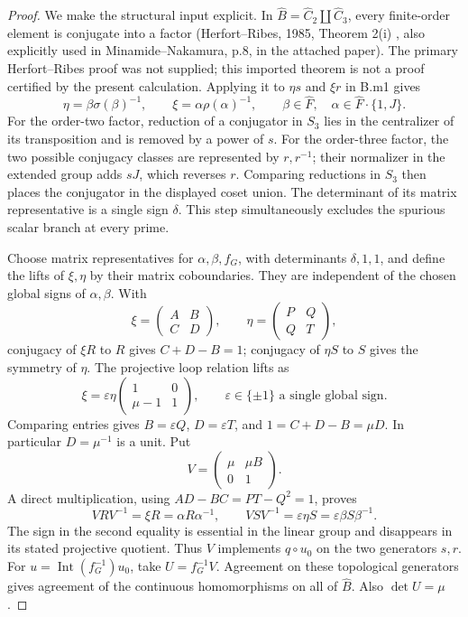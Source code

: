 \begin{proof}
We make the structural input explicit. In $\widehat B=\widehat C_2\amalg\widehat C_3$, every finite-order element is conjugate into a factor (Herfort--Ribes, 1985, Theorem 2(i) \citep{HerfortRibes1985dictionary}, also explicitly used in Minamide--Nakamura, p.8, in the attached paper). The primary Herfort--Ribes proof was not supplied; this imported theorem is not a proof certified by the present calculation. Applying it to $\eta s$ and $\xi r$ in B.m1 gives
\[
 \eta=\beta\sigma(\beta)^{-1},\qquad
 \xi=\alpha\rho(\alpha)^{-1},\qquad
 \beta\in\widehat F,\quad\alpha\in\widehat F\cdot\{1,J\}.
\]
For the order-two factor, reduction of a conjugator in $S_3$ lies in the centralizer of its transposition and is removed by a power of $s$. For the order-three factor, the two possible conjugacy classes are represented by $r,r^{-1}$; their normalizer in the extended group adds $sJ$, which reverses $r$. Comparing reductions in $S_3$ then places the conjugator in the displayed coset union. The determinant of its matrix representative is a single sign $\delta$. This step simultaneously excludes the spurious scalar branch at every prime.

Choose matrix representatives for $\alpha,\beta,f_G$, with determinants $\delta,1,1$, and define the lifts of $\xi,\eta$ by their matrix coboundaries. They are independent of the chosen global signs of $\alpha,\beta$. With
\[
 \xi=\begin{pmatrix}A&B\\C&D\end{pmatrix},\qquad
 \eta=\begin{pmatrix}P&Q\\Q&T\end{pmatrix},
\]
conjugacy of $\xi R$ to $R$ gives $C+D-B=1$; conjugacy of $\eta S$ to $S$ gives the symmetry of $\eta$. The projective loop relation lifts as
\[
 \xi=\varepsilon\eta
 \begin{pmatrix}1&0\\\mu-1&1\end{pmatrix},
 \qquad\varepsilon\in\{\pm1\}\text{ a single global sign}.
\]
Comparing entries gives $B=\varepsilon Q$, $D=\varepsilon T$, and
$1=C+D-B=\mu D$. In particular $D=\mu^{-1}$ is a unit. Put
\[
 V=\begin{pmatrix}\mu&\mu B\\0&1\end{pmatrix}.
\]
A direct multiplication, using $AD-BC=PT-Q^2=1$, proves
\[
 VRV^{-1}=\xi R=\alpha R\alpha^{-1},\qquad
 VSV^{-1}=\varepsilon\eta S=\varepsilon\beta S\beta^{-1}.
\]
The sign in the second equality is essential in the linear group and disappears in its stated projective quotient. Thus $V$ implements $q\circ u_0$ on the two generators $s,r$. For $u=\operatorname{Int}(f_G^{-1})u_0$, take $U=f_G^{-1}V$. Agreement on these topological generators gives agreement of the continuous homomorphisms on all of $\widehat B$. Also $\det U=\mu$.


\end{proof}
